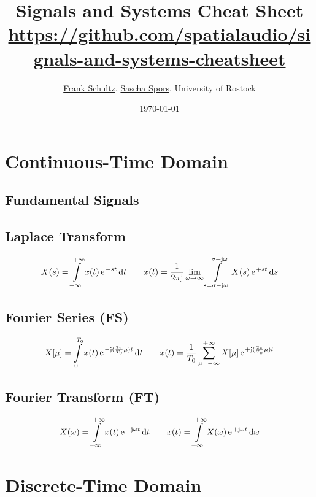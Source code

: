 \documentclass[landscape,columns=4]{cheatsheet}
\title{Signals and Systems Cheat Sheet\\
\tiny{\url{https://github.com/spatialaudio/signals-and-systems-cheatsheet}}}
\author{
\href{mailto:frank.schultz@uni-rostock.de}{Frank Schultz},
\href{mailto:sascha.spors@uni-rostock.de}{Sascha Spors},
University of Rostock
}
\date{\today}
\begin{document}

\section{Continuous-Time Domain}

\subsection{Fundamental Signals}

\subsection{Laplace Transform}
%
\begin{align*}
X(s) = \int\limits_{-\infty}^{+\infty} x(t) \, \e^{-s t}\,\mathrm{d}t
\qquad
x(t) = \frac{1}{2\pi\im}\lim_{\omega\to\infty}\int\limits_{s=\sigma-\im\omega}^{\sigma+\im\omega} X(s) \,\e^{+s t}\,\mathrm{d}s
\end{align*}


\subsection{Fourier Series (FS)}
%
\begin{align*}
X[\mu] = \int\limits_{0}^{T_0} x(t) \, \e^{-\im (\frac{2\pi}{T_0} \mu) t}\,\mathrm{d}t
\qquad
x(t) = \frac{1}{T_0}\sum\limits_{\mu=-\infty}^{+\infty} X[\mu] \,\e^{+\im (\frac{2\pi}{T_0} \mu) t}
\end{align*}

\subsection{Fourier Transform (FT)}
%
\begin{align*}
X(\omega) = \int\limits_{-\infty}^{+\infty} x(t) \,\e^{-\im \omega t}\,\mathrm{d}t
\qquad
x(t) = \int\limits_{-\infty}^{+\infty} X(\omega) \,\e^{+\im \omega t}\,\mathrm{d}\omega
\end{align*}


\hspace{2cm}

\section{Discrete-Time Domain}
\end{document}
